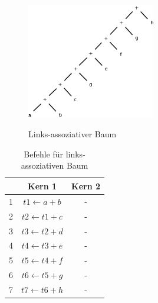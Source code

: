 \begin{figure}
	\begin{center}
	\includegraphics[width=0.5\textwidth]{images/links_assoziativer_baum}\\
	\end{center}
	\caption{Links-assoziativer Baum}
	\label{fig:links-assoziativer-baum}
\end{figure}

\begin{table}
	\begin{center}
			\begin{tabular}{|c|c|c|}
				\hline  & Kern 1 & Kern 2 \\ 
				\hline 1 & $ t1 \leftarrow a + b $& - \\ 
				\hline 2 & $ t2 \leftarrow t1 + c $& - \\ 
				\hline 3 & $ t3 \leftarrow t2 + d $& - \\ 
				\hline 4 & $ t4 \leftarrow t3 + e $& - \\ 
				\hline 5 & $ t5 \leftarrow t4 + f $& - \\ 
				\hline 6 & $ t6 \leftarrow t5 + g $& - \\ 
				\hline 7 & $ t7 \leftarrow t6 + h $& - \\ 
				\hline 
			\end{tabular}
	\end{center}
	\caption{Befehle für links-assoziativen Baum}
	\label{tab:links-assoziativer-baum}
\end{table}

